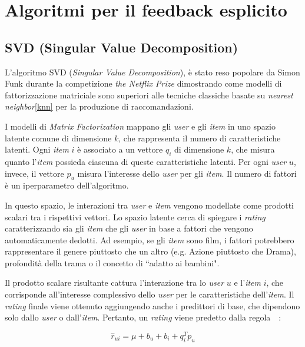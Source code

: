 \section{Algoritmi per il feedback esplicito}\label{algoritmi-per-feedback-esplicito}

\subsection{SVD (Singular Value Decomposition)}\label{svd}

L'algoritmo SVD (\textit{Singular Value Decomposition}), è stato reso popolare da Simon Funk durante la competizione \textit{the Netflix Prize} dimostrando come modelli di fattorizzazione matriciale sono superiori alle tecniche classiche basate su \textit{nearest neighbor}\ref{knn} per
la produzione di raccomandazioni.

I modelli di \textit{Matrix Factorization} mappano gli \textit{user} e gli \textit{item} in uno spazio latente comune di dimensione $k$, che rappresenta il numero di caratteristiche latenti. Ogni \textit{item} $i$ è associato a un vettore $q_i$ di dimensione $k$, che misura quanto l'\textit{item} possieda ciascuna di queste caratteristiche latenti. Per ogni \textit{user} $u$, invece, il vettore $p_u$ misura l'interesse dello \textit{user} per gli \textit{item}. Il numero di fattori è un iperparametro dell'algoritmo.

In questo spazio, le interazioni tra \textit{user} e \textit{item} vengono modellate come prodotti scalari tra i rispettivi vettori. Lo spazio latente cerca di spiegare i \textit{rating} caratterizzando sia gli \textit{item} che gli \textit{user} in base a fattori che vengono automaticamente dedotti. Ad esempio, se gli \textit{item} sono film, i fattori potrebbero rappresentare il genere piuttosto che un altro (e.g. Azione piuttosto che Drama), profondità della trama o il concetto di ``adatto ai bambini".

Il prodotto scalare risultante cattura l'interazione tra lo \textit{user} $u$ e l'\textit{item} $i$, che corrisponde all'interesse complessivo dello \textit{user} per le caratteristiche dell'\textit{item}. Il \textit{rating} finale viene ottenuto aggiungendo anche i predittori di base, che dipendono solo dallo \textit{user} o dall'\textit{item}. Pertanto, un \textit{rating} viene predetto dalla regola~\cite{SVD_analysis}~\cite{Recommendation_book}:

\[
\hat{r}_{ui} = \mu + b_u + b_i + q_i^T p_u
\]

